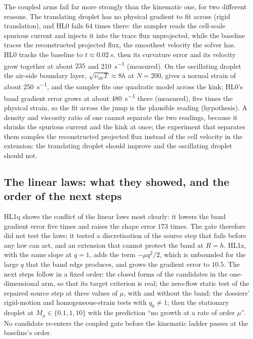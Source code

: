 \documentclass[preprint,3p,11pt]{elsarticle}
\begin{document}
The coupled arms fail far more strongly than the kinematic one, for two different
reasons. The translating droplet has no physical gradient to fit across (rigid
translation), and HL0 fails $64$ times there: the sampler reads the cell-scale spurious
current and injects it into the trace flux unprojected, while the baseline traces the
reconstructed projected flux, the smoothest velocity the solver has. HL0 tracks the
baseline to $t\approx\SI{0.02}{s}$, then its curvature error and its velocity grow
together at about $235$ and \SI{210}{s^{-1}} (measured). On the oscillating droplet the
air-side boundary layer, $\sqrt{\nu_\mathrm{air}T}\approx8h$ at $N=200$, gives a normal
strain of about \SI{250}{s^{-1}}, and the sampler fits one quadratic model across the
kink; HL0's band gradient error grows at about \SI{480}{s^{-1}} there (measured), five
times the physical strain, so the fit across the jump is the plausible reading
(hypothesis). A density and viscosity ratio of one cannot separate the two readings,
because it shrinks the spurious current and the kink at once; the experiment that
separates them samples the reconstructed projected flux instead of the cell velocity in
the extension: the translating droplet should improve and the oscillating droplet should
not.

\subsection{The linear laws: what they showed, and the order of the next steps}
HL1q shows the conflict of the linear laws most clearly: it lowers the band gradient error
five times and raises the shape error $173$ times. The gate therefore did not test the
laws; it tested a discretisation of the source step that fails before any law can act,
and an extension that cannot protect the band at $R=h$. HL1z, with the same slope at
$q=1$, adds the term $-\mu q^2/2$, which is unbounded for the large $q$ that the band edge
produces, and grows the gradient error to $10.5$. The next steps follow in a fixed order:
the closed forms of the candidates in the one-dimensional arm, so that its target criterion
is real; the zero-flow static test of the repaired source step at three values of $\mu$,
with and without the band; the dossiers' rigid-motion and homogeneous-strain tests with
$q_0\neq1$; then the stationary droplet at $M_\mu\in\{0.1,1,10\}$ with the prediction
``no growth at a rate of order $\mu$''. No candidate re-enters the coupled gate before the
kinematic ladder passes at the baseline's order.
\end{document}
